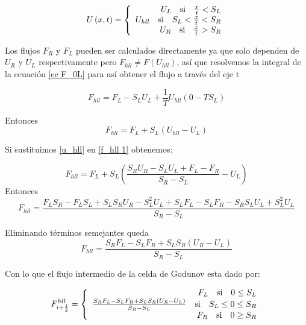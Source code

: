 \documentclass[12pt,a4paper]{book}
\begin{document}
\begin{equation}
U \left(x,t \right) = 
\left\lbrace
\begin{array}{rr}
U_L \quad \textup{si} \quad \frac{x}{t}< S_L  \\
U_{hll} \quad \textup{si} \quad S_L< \frac{x}{t} <S_R \\
U_R \quad \textup{si} \quad  \frac{x}{t} > S_R
\end{array}
\right.
\end{equation}

Los flujos $F_R$ y $F_L$ pueden ser calculados directamente ya que solo dependen de $U_R$ y $U_L$ respectivamente pero $F_{hll} \neq F \left( U_{hll} \right)$, así que resolvemos la integral de la ecuación \ref{ec F_0L} para así obtener el flujo a través del eje t

\begin{equation*}
F_{hll} = F_L -S_L U_L+ \frac{1}{T}U_{hll}\left(0- TS_L\right)
\end{equation*}

Entonces
\begin{equation}\label{f_hll 1}
F_{hll} = F_L +S_L \left( U_{hll} -U_L \right)
\end{equation}

Si sustituimos \ref{u_hll} en \ref{f_hll 1} obtenemos:

\begin{equation*}
F_{hll} = F_L +S_L \left( \frac{S_R U_R - S_L U_L + F_L - F_R}{S_R - S_L} -U_L \right)
\end{equation*}
Entonces
\begin{equation*}
F_{hll} = \frac{F_L S_R -F_L S_L+S_L S_R U_R-S_L^2 U_L+S_L  F_L- S_L F_R-S_R S_L U_L + S_L^2 U_L}{S_R-S_L}
\end{equation*}

Eliminando términos semejantes queda
\begin{equation}
F_{hll} = \frac{S_R F_L -S_L F_R + S_L S_R \left(U_R-U_L \right)}{S_R -S_L}
\end{equation}

Con lo que el flujo intermedio de la celda de Godunov esta dado por:

\begin{equation} \label{fluxesHLL}
F_{i+\frac{1}{2}}^{hll} = 
\left\lbrace
\begin{array}{rr}
F_L \quad \textup{si} \quad 0 \leq S_L  \\
\frac{S_R F_L -S_L F_R + S_L S_R \left(U_R-U_L \right)}{S_R -S_L} \quad \textup{si} \quad S_L \leq 0 \leq S_R \\
F_R \quad \textup{si} \quad  0 \geq  S_R
\end{array}
\right.
\end{equation}
\end{document}
